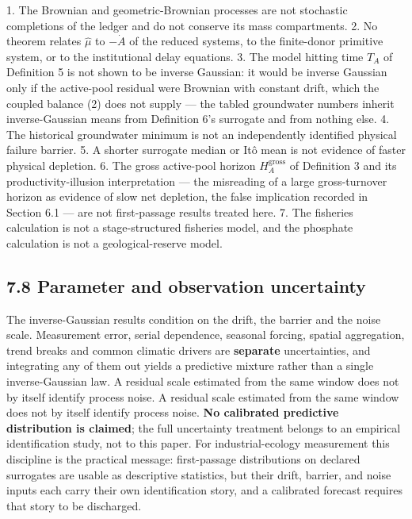 \documentclass[11pt]{article}
\begin{document}
1. The Brownian and geometric-Brownian processes are not stochastic completions of the ledger and do not conserve its mass compartments. 2. No theorem relates \(\widehat\mu\) to \(-\dot A\) of the reduced systems, to the finite-donor primitive system, or to the institutional delay equations. 3. The model hitting time \(T_A\) of Definition 5 is not shown to be inverse Gaussian: it would be inverse Gaussian only if the active-pool residual were Brownian with constant drift, which the coupled balance (2) does not supply --- the tabled groundwater numbers inherit inverse-Gaussian means from Definition 6's surrogate and from nothing else. 4. The historical groundwater minimum is not an independently identified physical failure barrier. 5. A shorter surrogate median or It\^{o} mean is not evidence of faster physical depletion. 6. The gross active-pool horizon \(H_A^{\mathrm{gross}}\) of Definition 3 and its productivity-illusion interpretation --- the misreading of a large gross-turnover horizon as evidence of slow net depletion, the false implication recorded in Section 6.1 --- are not first-passage results treated here. 7. The fisheries calculation is not a stage-structured fisheries model, and the phosphate calculation is not a geological-reserve model.

\subsection*{7.8 Parameter and observation uncertainty}\label{78-parameter-and-observation-uncertainty}

The inverse-Gaussian results condition on the drift, the barrier and the noise scale. Measurement error, serial dependence, seasonal forcing, spatial aggregation, trend breaks and common climatic drivers are \textbf{separate} uncertainties, and integrating any of them out yields a predictive mixture rather than a single inverse-Gaussian law. A residual scale estimated from the same window does not by itself identify process noise. A residual scale estimated from the same window does not by itself identify process noise. \textbf{No calibrated predictive distribution is claimed}; the full uncertainty treatment belongs to an empirical identification study, not to this paper. For industrial-ecology measurement this discipline is the practical message: first-passage distributions on declared surrogates are usable as descriptive statistics, but their drift, barrier, and noise inputs each carry their own identification story, and a calibrated forecast requires that story to be discharged.
\end{document}
